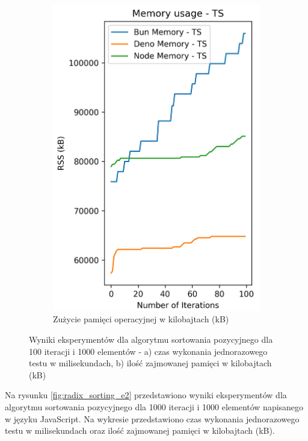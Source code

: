 \begin{figure}[H]
\begin{subfigure}[b]{0.4\textwidth}
    \includegraphics[width=\textwidth]{Figures/sorting/sorting_radix_100_1000_ts_memory.png}
    \caption{Zużycie pamięci operacyjnej w kilobajtach (kB)}
    \label{fig:radix_sorting_e1_ts_memory}
  \end{subfigure}
  \caption{Wyniki eksperymentów dla algorytmu sortowania pozycyjnego dla 100 iteracji i 1000 elementów - a) czas wykonania jednorazowego testu w milisekundach, b) ilość zajmowanej pamięci w kilobajtach (kB)}
  \label{fig:radix_sorting_e1_ts}
\end{figure}

Na rysunku \ref{fig:radix_sorting_e2} przedstawiono wyniki eksperymentów dla algorytmu sortowania pozycyjnego dla 1000 iteracji i 1000 elementów napisanego w języku JavaScript. Na wykresie przedstawiono czas wykonania jednorazowego testu w milisekundach oraz ilość zajmowanej pamięci w kilobajtach (kB).

